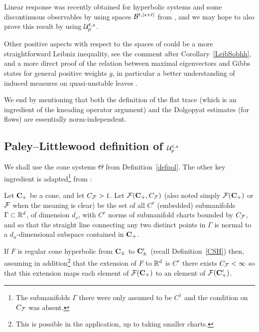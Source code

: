 \documentclass[10pt,twoside]{amsart}
\begin{document}
\begin{itemize}
Linear response was recently obtained \cite{BKL16} for hyperbolic systems
and  some discontinuous observables
by using spaces $\mathcal{B}^{t,|s+t|}$ from \cite{GL1}, and we may hope to also prove this
result by using $\mathcal{U}^{t,s}_p$.

Other positive aspects with respect to the
spaces of \cite{BT1,BT2} could be a more straightforward  Leibniz inequality, see the
comment after Corollary~\ref{LeibSobhh}, 
and a more direct \cite{Ba} proof of the relation between maximal
eigenvectors and Gibbs states for general positive weights $g$, in particular a better understanding
of induced measures on quasi-unstable leaves \cite{GL2}.
\end{itemize}

We end by mentioning  that both the definition of the flat trace \cite{BT2, Ba} 
(which is an ingredient of the kneading operator argument) and the Dolgopyat
estimates \cite{BLiv} (for flows) are essentially norm-independent.









\subsection{Paley--Littlewood definition of $\mathcal{U}^{t,s}_p$}

 We shall use the cone systems $\Theta$ 
from Definition~\ref{defpol}. The other 
key ingredient is  adapted\footnote{The submanifolds $\Gamma$ there were only
assumed to be $C^1$ and the condition on $C_{\mathcal{F}}$ was absent.} from \cite{BT2}:

\begin{definition}\label{fakke}
Let  $\mathbf{C}_+$ be a cone, and let $C_{\mathcal{F}} > 1$.
Let $\mathcal{F}(\mathbf{C}_+,C_{\mathcal{F}})$ (also noted simply $\mathcal{F}(\mathbf{C}_+)$ or
$\mathcal{F}$ when the meaning is clear) be the set
of all $C^r$ (embedded) submanifolds $\Gamma\subset \mathbb{R}^d$, of dimension $d_s$,
with $C^r$ norms of submanifold
charts bounded by $C_{\mathcal{F}}$, and
so that the straight line connecting any two distinct points in 
$\Gamma$ is normal to a $d_u$-dimensional subspace contained in  $\mathbf{C}_+$. 
\end{definition}



If $F$  is regular cone hyperbolic from $\mathbf{C}_{\pm}$ to $\mathbf{C}_{\pm}'$ (recall Definition~\ref{CSH}) then,
assuming in addition\footnote{This is possible in the application, up
to taking smaller charts.} that the extension of $F$ to $\mathbb{R}^d$ is $C^r$ 
there exists $C_{\mathcal{F}}<\infty$ so that this extension 
maps
each element of $\mathcal{F}(\mathbf{C}_+)$ to an element of $\mathcal{F}(\mathbf{C}_+')$.
\end{document}
